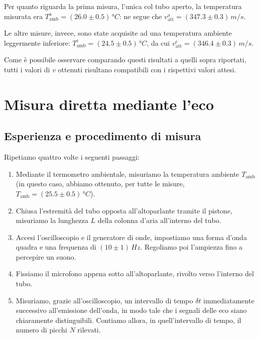\documentclass{article}
\begin{document}
Per quanto riguarda la prima misura, l'unica col tubo aperto,
la temperatura misurata era
$T_\text{amb}^\text{a} = (26.0\pm0.5)\,\unit{\degree C}$:
ne segue che $v_\text{att}^\text{a}=(347.3\pm0.3)\,\unit{m\per s}$.

Le altre misure, invece, sono state acquisite ad una
temperatura ambiente leggermente inferiore:
$T_\text{amb}^\text{c} = (24.5\pm0.5)\,\unit{\degree C}$,
da cui $v_\text{att}^\text{c} = (346.4\pm0.3)\,\unit{m\per s}$.

\vspace{2mm}
Come è possibile osservare comparando questi risultati a
quelli sopra riportati, tutti i valori di $v$ ottenuti
risultano compatibili con i rispettivi valori attesi.

\section{Misura diretta mediante l'eco}

\subsection{Esperienza e procedimento di misura}

Ripetiamo quattro volte i seguenti passaggi:
\begin{enumerate}
  \item
    Mediante il termometro ambientale, misuriamo la temperatura ambiente
    $T_\text{amb}$ (in questo caso, abbiamo ottenuto, per tutte le misure,
    $T_\text{amb}=(25.5\pm0.5)\,\unit{\degree C}$).
  \item
    Chiusa l'estremità del tubo opposta all'altoparlante tramite il pistone,
    misuriamo la lunghezza $L$ della colonna d'aria all'interno del tubo.
  \item
    Accesi l'oscilloscopio e il generatore di onde, impostiamo una
    forma d'onda quadra e una frequenza di $(10\pm1)\,\unit{Hz}$.
    Regoliamo poi l'ampiezza fino a percepire un suono.
  \item
    Fissiamo il microfono appena sotto all'altoparlante, rivolto verso
    l'interno del tubo.
  \item
    Misuriamo, grazie all'oscilloscopio, un intervallo di tempo $\delta t$
    immediatamente successivo all'emissione dell'onda,
    in modo tale che i segnali delle eco siano chiaramente distinguibili.
    Contiamo allora, in quell'intervallo di tempo, il numero di picchi
    $N$ rilevati.
\end{enumerate}
\end{document}

